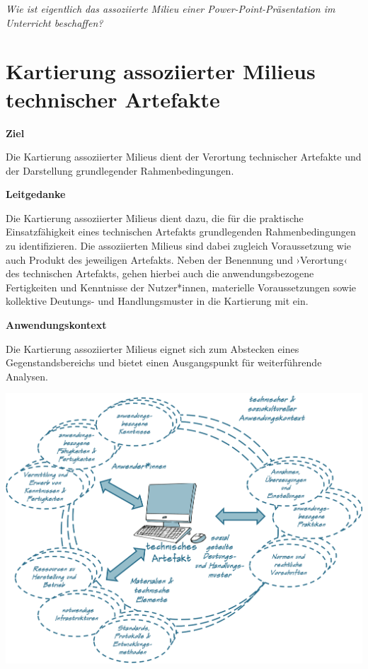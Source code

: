 \documentclass[
  a4paper,
]{book}
\begin{document}
\begin{blackbox}
\emph{Wie ist eigentlich das assoziierte Milieu einer Power-Point-Präsentation im Unterricht beschaffen?}

\end{blackbox}

\section{Kartierung assoziierter Milieus technischer Artefakte}\label{kartierung-assoziierter-milieus-technischer-artefakte}

\textbf{Ziel}

Die Kartierung assoziierter Milieus dient der Verortung technischer Artefakte und der Darstellung grundlegender Rahmenbedingungen.

\textbf{Leitgedanke}

Die Kartierung assoziierter Milieus dient dazu, die für die praktische Einsatzfähigkeit eines technischen Artefakts grundlegenden Rahmenbedingungen zu identifizieren. Die assoziierten Milieus sind dabei zugleich Voraussetzung wie auch Produkt des jeweiligen Artefakts. Neben der Benennung und ›Verortung‹ des technischen Artefakts, gehen hierbei auch die anwendungsbezogene Fertigkeiten und Kenntnisse der Nutzer*innen, materielle Voraussetzungen sowie kollektive Deutungs- und Handlungsmuster in die Kartierung mit ein.

\textbf{Anwendungskontext}

Die Kartierung assoziierter Milieus eignet sich zum Abstecken eines Gegenstandsbereichs und bietet einen Ausgangspunkt für weiterführende Analysen.

\begin{center}\includegraphics{Figures/12-03-Leittext Milieu} \end{center}
\end{document}
